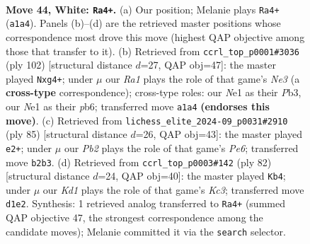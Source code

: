 \documentclass[11pt]{article}
\begin{document}
\clearpage

\begin{figure}[p]\centering
\begin{subfigure}{0.46\textwidth}\centering
\resizebox{\linewidth}{!}{%
\newchessgame
\chessboard[
  setfen={8/p5R1/8/2p4P/2k1pp2/8/1P6/R2KN2r w - - 0 44},
  showmover=false,
  pgfstyle=straightmove, color=movearrow, markmove={a1-a4}
]}
\caption{}
\end{subfigure}\hfill
\begin{subfigure}{0.46\textwidth}\centering
\resizebox{\linewidth}{!}{%
\newchessgame
\chessboard[
  setfen={8/p7/1p3k2/1R4p1/4K1p1/1P2N3/1r6/8 w - - 0 52},
  showmover=false,
  pgfstyle=straightmove, color=movearrow, markmove={e3-g4}
]}
\caption{}
\end{subfigure}
\\[4pt]
\begin{subfigure}{0.46\textwidth}\centering
\resizebox{\linewidth}{!}{%
\newchessgame
\chessboard[
  setfen={2r5/5R2/8/P7/3p1nP1/4pk2/2P4P/3K4 b - - 7 43},
  showmover=false,
  pgfstyle=straightmove, color=movearrow, markmove={e3-e2}
]}
\caption{}
\end{subfigure}\hfill
\begin{subfigure}{0.46\textwidth}\centering
\resizebox{\linewidth}{!}{%
\newchessgame
\chessboard[
  setfen={2r5/5pk1/p7/1pNR3p/8/2K4P/8/8 w - - 0 42},
  showmover=false,
  pgfstyle=straightmove, color=movearrow, markmove={c3-b4}
]}
\caption{}
\end{subfigure}
\caption{\textbf{Move 44, White: \texttt{Ra4+}.} (a) Our position; Melanie plays \texttt{Ra4+} (\texttt{a1a4}). Panels (b)--(d) are the retrieved master positions whose correspondence most drove this move (highest QAP objective among those that transfer to it). (b) Retrieved from \texttt{ccrl\_top\_p0001\#3036} (ply 102) [structural distance $d$=27, QAP obj=47]: the master played \texttt{Nxg4+}; under $\mu$ our \emph{Ra1} plays the role of that game's \emph{Ne3} (a \textbf{cross-type} correspondence); cross-type roles: our \emph{N}e1 as their \emph{P}b3, our \emph{N}e1 as their \emph{p}b6; transferred move \texttt{a1a4} \textbf{(endorses this move)}. (c) Retrieved from \texttt{lichess\_elite\_2024-09\_p0031\#2910} (ply 85) [structural distance $d$=26, QAP obj=43]: the master played \texttt{e2+}; under $\mu$ our \emph{Pb2} plays the role of that game's \emph{Pe6}; transferred move \texttt{b2b3}. (d) Retrieved from \texttt{ccrl\_top\_p0003\#142} (ply 82) [structural distance $d$=24, QAP obj=40]: the master played \texttt{Kb4}; under $\mu$ our \emph{Kd1} plays the role of that game's \emph{Kc3}; transferred move \texttt{d1e2}. Synthesis: 1 retrieved analog transferred to \texttt{Ra4+} (summed QAP objective 47, the strongest correspondence among the candidate moves); Melanie committed it via the \texttt{search} selector.}
\label{fig:thought-m86}
\end{figure}
\end{document}
